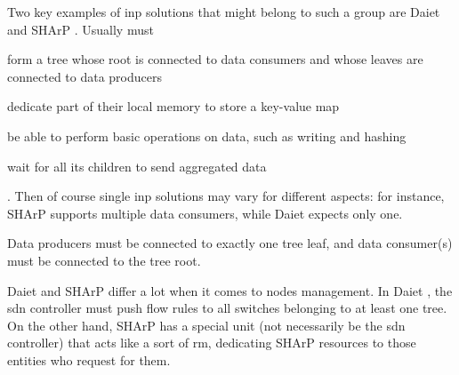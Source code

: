Two key examples of \gls{inp} solutions that might belong to such a group are Daiet \cite{daiet} and SHArP \cite{sharp}.
Usually  must
\begin{mylist}
    \item form a tree whose root is connected to data consumers and whose leaves are connected to data producers
    \item dedicate part of their local memory to store a key-value map
    \item be able to perform basic operations on data, such as writing and hashing
    \item wait for all its children to send aggregated data
\end{mylist}.
Then of course single \gls{inp} solutions may vary for different aspects: for instance, SHArP \cite{sharp} supports multiple data consumers, while Daiet \cite{daiet} expects only one.

Data producers must be connected to exactly one tree leaf, and data consumer(s) must be connected to the tree root.

Daiet \cite{daiet} and SHArP \cite{sharp} differ a lot when it comes to nodes management.
In Daiet \cite{daiet}, the \gls{sdn} controller must push flow rules to all switches belonging to at least one tree.
On the other hand, SHArP \cite{sharp} has a special unit (not necessarily be the \gls{sdn} controller) that acts like a sort of \gls{rm}, dedicating SHArP \cite{sharp} resources to those entities who request for them.